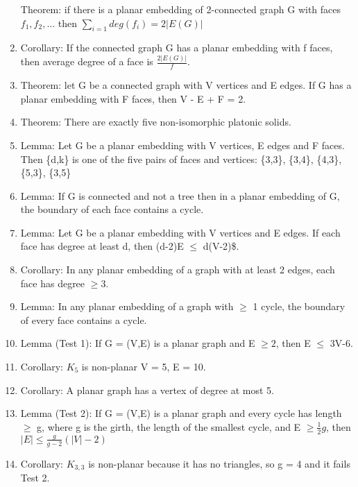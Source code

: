\documentclass[]{article}
\begin{document}
\begin{enumerate}
  Theorem: if there is a planar embedding of 2-connected graph G with
  faces $f_1, f_2, ...$ then $\sum_{i=1} deg(f_i) = 2|E(G)|$
\item
  Corollary: If the connected graph G has a planar embedding with f
  faces, then average degree of a face is $\frac{2|E(G)|}{f}$.
\item
  Theorem: let G be a connected graph with \textbar{}V\textbar{}
  vertices and \textbar{}E\textbar{} edges. If G has a planar embedding
  with \textbar{}F\textbar{} faces, then \textbar{}V\textbar{} -
  \textbar{}E\textbar{} + \textbar{}F\textbar{} = 2.
\item
  Theorem: There are exactly five non-isomorphic platonic solids.
\item
  Lemma: Let G be a planar embedding with \textbar{}V\textbar{}
  vertices, \textbar{}E\textbar{} edges and \textbar{}F\textbar{} faces.
  Then \{d,k\} is one of the five pairs of faces and vertices: \{3,3\},
  \{3,4\}, \{4,3\}, \{5,3\}, \{3,5\}
\item
  Lemma: If G is connected and not a tree then in a planar embedding of
  G, the boundary of each face contains a cycle.
\item
  Lemma: Let G be a planar embedding with \textbar{}V\textbar{} vertices
  and \textbar{}E\textbar{} edges. If each face has degree at least d,
  then (d-2)\textbar{}E\textbar{} $\leq$ d(\textbar{}V\textbar{}-2)\$.
\item
  Corollary: In any planar embedding of a graph with at least 2 edges,
  each face has degree $\geq 3$.
\item
  Lemma: In any planar embedding of a graph with $\geq$ 1 cycle, the
  boundary of every face contains a cycle.
\item
  Lemma (Test 1): If G = (V,E) is a planar graph and
  \textbar{}E\textbar{} $\geq 2$, then \textbar{}E\textbar{} $\leq$
  3\textbar{}V\textbar{}-6.
\item
  Corollary: $K_5$ is non-planar \textbar{}V\textbar{} = 5,
  \textbar{}E\textbar{} = 10.
\item
  Corollary: A planar graph has a vertex of degree at most 5.
\item
  Lemma (Test 2): If G = (V,E) is a planar graph and every cycle has
  length $\geq$ g, where g is the girth, the length of the smallest
  cycle, and \textbar{}E\textbar{} $\geq \frac{1}{2}g$, then
  $|E| \leq \frac{g}{g-2}(|V| - 2)$
\item
  Corollary: $K_{3,3}$ is non-planar because it has no triangles, so g =
  4 and it fails Test 2.

\end{enumerate}
\end{document}
